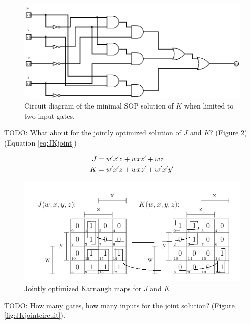 \documentclass[12pt]{article}
\begin{document}
\begin{figure}[!htb]
\center
\includegraphics[scale=0.5]{Kminsop-02}
\caption{Circuit diagram of the minimal SOP solution of $K$ when limited to two input gates.}
\label{fig:Kminsop-02}
\end{figure}

\clearpage

TODO: What about for the jointly optimized solution of $J$ and $K$?
(Figure \ref{fig:JKjointkmap})
(Equation \ref{eq:JKjoint})

\begin{align}
	J &= w'x'z + wxz' + wz  \notag \\
	K &= w'x'z + wxz' + w'x'y'  \label{eq:JKjoint}
\end{align}

\begin{figure}[!htb]
\center
\includegraphics[scale=0.60]{JKkmap-01}
\caption{Jointly optimized Karnaugh maps for $J$ and $K$.}
\label{fig:JKjointkmap}
\end{figure}

TODO: How many gates, how many inputs for the joint solution?
(Figure \ref{fig:JKjointcircuit}).
\end{document}
